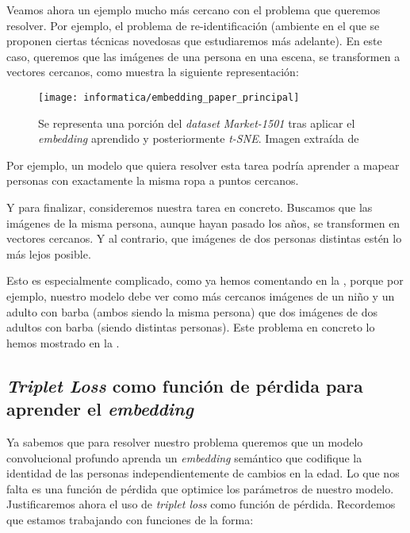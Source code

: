 \begin{ejemplo}
	Veamos ahora un ejemplo mucho más cercano con el problema que queremos resolver. Por ejemplo, el problema de re-identificación (ambiente en el que se proponen ciertas técnicas novedosas que estudiaremos más adelante). En este caso, queremos que las imágenes de una persona en una escena, se transformen a vectores cercanos, como muestra la siguiente representación:

	\begin{figure}[H]
		\centering
		\texttt{[image: informatica/embedding\_paper\_principal]}
		\caption{Se representa una porción del \textit{dataset} \textit{Market-1501} tras aplicar el \textit{embedding} aprendido y posteriormente \textit{t-SNE}. Imagen extraída de \cite{informatica:principal}}
	\end{figure}

	Por ejemplo, un modelo que quiera resolver esta tarea podría aprender a mapear personas con exactamente la misma ropa a puntos cercanos.
\end{ejemplo}

\begin{ejemplo}

	Y para finalizar, consideremos nuestra tarea en concreto. Buscamos que las imágenes de la misma persona, aunque hayan pasado los años, se transformen en vectores cercanos. Y al contrario, que imágenes de dos personas distintas estén lo más lejos posible.

	Esto es especialmente complicado, como ya hemos comentando en la , porque por ejemplo, nuestro modelo debe ver como más cercanos imágenes de un niño y un adulto con barba (ambos siendo la misma persona) que dos imágenes de dos adultos con barba (siendo distintas personas). Este problema en concreto lo hemos mostrado en la .
\end{ejemplo}


\subsection{\textit{Triplet Loss} como función de pérdida para aprender el \textit{embedding}} \label{isec:triplet_loss}

Ya sabemos que para resolver nuestro problema queremos que un modelo convolucional profundo aprenda un \textit{embedding} semántico que codifique la identidad de las personas independientemente de cambios en la edad. Lo que nos falta es una función de pérdida que optimice los parámetros de nuestro modelo. Justificaremos ahora el uso de \textit{triplet loss} como función de pérdida. Recordemos que estamos trabajando con funciones de la forma:


